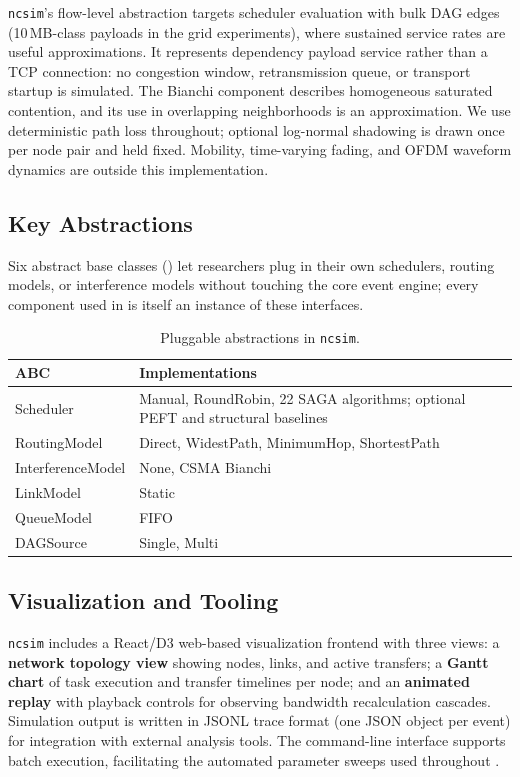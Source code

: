 \documentclass[conference]{IEEEtran}
\newcommand{\ncsim}{\texttt{ncsim}}
\begin{document}
\ncsim{}'s flow-level abstraction targets scheduler evaluation with bulk DAG
edges (10\,MB-class payloads in the grid experiments), where sustained
service rates are useful approximations. It represents dependency payload
service rather than a TCP connection: no congestion window, retransmission
queue, or transport startup is simulated. The Bianchi component describes
homogeneous saturated contention, and its use in overlapping neighborhoods
is an approximation. We use deterministic path loss throughout; optional
log-normal shadowing is drawn once per node pair and held fixed. Mobility,
time-varying fading, and OFDM waveform dynamics are outside this implementation.

\subsection{Key Abstractions}

Six abstract base classes () let researchers plug
in their own schedulers, routing models, or interference models without
touching the core event engine; every component used in
 is itself an instance of these interfaces.

\begin{table}[t]
\centering
\caption{Pluggable abstractions in \ncsim{}.}
\label{tab:abstractions}
\begin{tabular}{@{}lp{4.8cm}@{}}
\toprule
\textbf{ABC} & \textbf{Implementations} \\
\midrule
Scheduler & Manual, RoundRobin, 22 SAGA algorithms; optional PEFT and structural baselines \\
RoutingModel & Direct, WidestPath, MinimumHop, ShortestPath \\
InterferenceModel & None, CSMA Bianchi \\
LinkModel & Static \\
QueueModel & FIFO \\
DAGSource & Single, Multi \\
\bottomrule
\end{tabular}
\end{table}

\subsection{Visualization and Tooling}
\label{sec:viz}

\ncsim{} includes a React/D3 web-based visualization frontend with three
views: a \textbf{network topology view} showing nodes, links, and active
transfers; a \textbf{Gantt chart} of task execution and transfer timelines
per node; and an \textbf{animated replay} with playback controls for
observing bandwidth recalculation cascades.  Simulation output is written
in JSONL trace format (one JSON object per event) for integration with
external analysis tools.  The command-line interface supports batch
execution, facilitating the automated parameter sweeps used throughout
.
\end{document}
